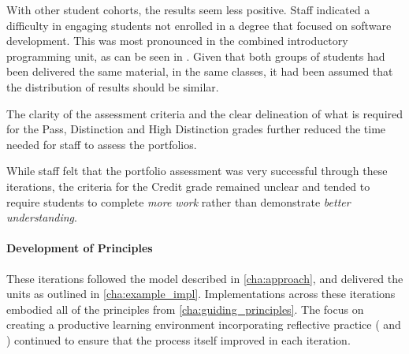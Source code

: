 With other student cohorts, the results seem less positive. Staff indicated a difficulty in engaging students not enrolled in a degree that focused on software development. This was most pronounced in the combined introductory programming unit, as can be seen in . Given that both groups of students had been delivered the same material, in the same classes, it had been assumed that the distribution of results should be similar. 



The clarity of the assessment criteria and the clear delineation of what is required for the Pass, Distinction and High Distinction grades further reduced the time needed for staff to assess the portfolios.

While staff felt that the portfolio assessment was very successful through these iterations, the criteria for the Credit grade remained unclear and tended to require students to complete \emph{more work} rather than demonstrate \emph{better understanding}.

\paragraph{Development of Principles} %

These iterations followed the model described in \cref{cha:approach}, and delivered the units as outlined in \cref{cha:example_impl}. Implementations across these iterations embodied all of the principles from \cref{cha:guiding_principles}. The focus on creating a productive learning environment incorporating reflective practice ( and ) continued to ensure that the process itself improved in each iteration.



